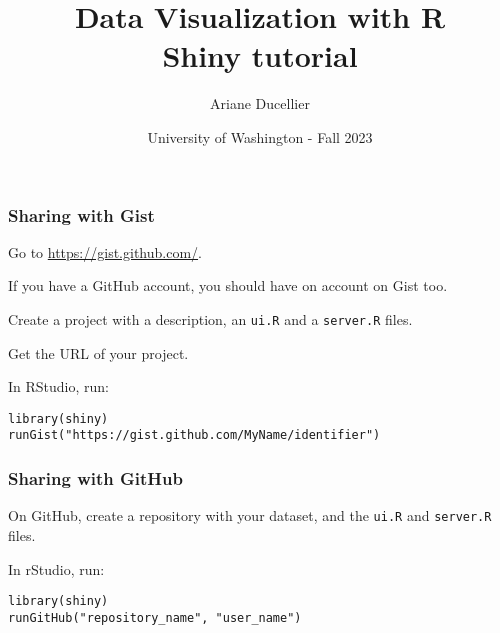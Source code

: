 \documentclass{beamer}
\title[Data Visualization with R - Shiny tutorial]{Data Visualization with R \\ Shiny tutorial}
\author{Ariane Ducellier}
\date{University of Washington - Fall 2023}
\begin{document}
	\begin{frame}
		\titlepage
	\end{frame}

	\begin{frame}[fragile]
		\frametitle{Sharing with Gist}

		Go to \href{https://gist.github.com/}{https://gist.github.com/}.

		\vspace{1em}

		If you have a GitHub account, you should have on account on Gist too.

		\vspace{1em}

		Create a project with a description, an \verb|ui.R| and a \verb|server.R| files.

		\vspace{1em}

		Get the URL of your project.

		\vspace{1em}

		In RStudio, run:
		
		\begin{exampleblock}{}
		\begin{BVerbatim}
library(shiny)
runGist("https://gist.github.com/MyName/identifier")
		\end{BVerbatim}
		\end{exampleblock}{}

	\end{frame}

	\begin{frame}[fragile]
		\frametitle{Sharing with GitHub}

		On GitHub, create a repository with your dataset, and the \verb|ui.R| and \verb|server.R| files.

		\vspace{1em}

		In rStudio, run:
		
		\begin{exampleblock}{}
		\begin{BVerbatim}
library(shiny)
runGitHub("repository_name", "user_name")
		\end{BVerbatim}
		\end{exampleblock}{}

 	
	\end{frame}
\end{document}
